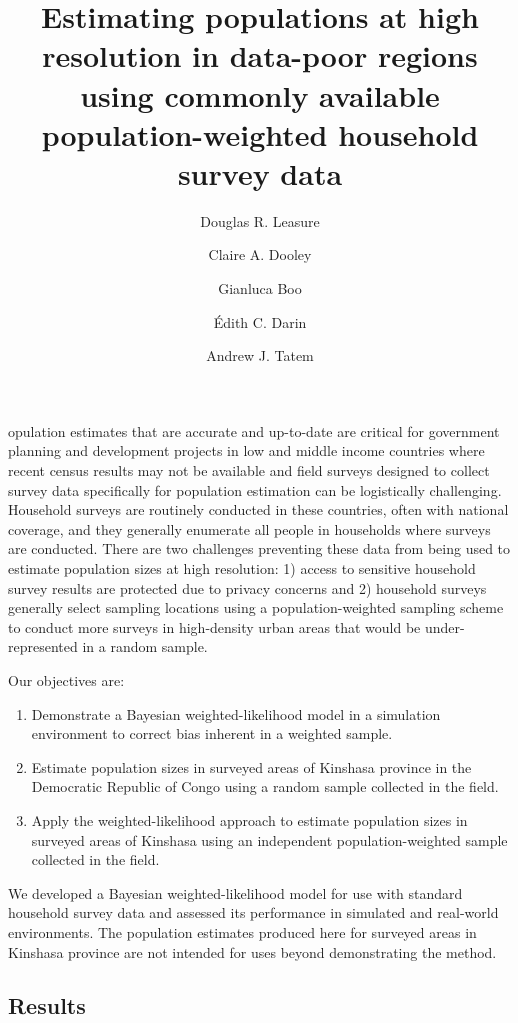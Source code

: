 \documentclass[9pt,twocolumn,twoside,lineno]{pnas-new}
\title{Estimating populations at high resolution in data-poor regions using commonly available population-weighted household survey data}
\author[a,1]{Douglas R. Leasure}
\author[a]{Claire A. Dooley}
\author[a]{Gianluca Boo}
\author[a]{Édith C. Darin}
\author[a]{Andrew J. Tatem}
\affil[a]{WorldPop, Geography and Environmental Science, University of Southampton, Highfield, Southampton SO17 1BJ, UK.}
\begin{document}
\maketitle
\thispagestyle{firststyle}


opulation estimates that are accurate and up-to-date are critical for government planning and development projects in low and middle income countries where recent census results may not be available and field surveys designed to collect survey data specifically for population estimation can be logistically challenging.  Household surveys are routinely conducted in these countries, often with national coverage, and they generally enumerate all people in households where surveys are conducted.  There are two challenges preventing these data from being used to estimate population sizes at high resolution: 1) access to sensitive household survey results are protected due to privacy concerns and 2) household surveys generally select sampling locations using a population-weighted sampling scheme to conduct more surveys in high-density urban areas that would be under-represented in a random sample. 

Our objectives are:

\begin{enumerate}
	\item Demonstrate a Bayesian weighted-likelihood model in a simulation environment to correct bias inherent in a weighted sample.
	\item Estimate population sizes in surveyed areas of Kinshasa province in the Democratic Republic of Congo using a random sample collected in the field.
	\item Apply the weighted-likelihood approach to estimate population sizes in surveyed areas of Kinshasa using an independent population-weighted sample collected in the field.
\end{enumerate}

We developed a Bayesian weighted-likelihood model for use with standard household survey data and assessed its performance in simulated and real-world environments.  The population estimates produced here for surveyed areas in Kinshasa province are not intended for uses beyond demonstrating the method.

\subsection*{Results}
\end{document}
